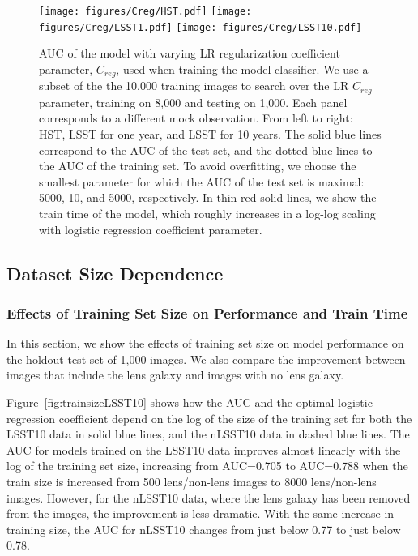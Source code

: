 \documentclass{emulateapj}
\begin{document}
\begin{figure*}[t]
\begin{center}
\texttt{[image: figures/Creg/HST.pdf]}
\texttt{[image: figures/Creg/LSST1.pdf]}
\texttt{[image: figures/Creg/LSST10.pdf]}
\caption{AUC of the model with varying LR regularization coefficient
  parameter, $C_{reg}$, used when training the model classifier.  We
  use a subset of the the 10,000 training images to search over the LR
  $C_{reg}$ parameter, training on 8,000 and testing on 1,000.  Each
  panel corresponds to a different mock observation.  From left to
  right: HST, LSST for one year, and LSST for 10 years.  The solid
  blue lines correspond to the AUC of the test set, and the dotted
  blue lines to the AUC of the training set.  To avoid overfitting, we
  choose the smallest parameter for which the AUC of the test set is
  maximal: 5000, 10, and 5000, respectively.  In thin red solid lines,
  we show the train time of the model, which roughly increases in a
  log-log scaling with logistic regression coefficient
  parameter.}\label{fig:regularization}
\end{center}
\end{figure*}

\subsection{Dataset Size Dependence}\label{sec:datasize}
\subsubsection{Effects of Training Set Size on Performance and Train Time}\label{sec:trainsetsize}

In this section, we show the effects of training set size on model
performance on the holdout test set of 1,000 images.  We also compare
the improvement between images that include the lens galaxy and images
with no lens galaxy.

Figure~\ref{fig:trainsizeLSST10} shows how the AUC and the optimal
logistic regression coefficient depend on the log of the size of the
training set for both the LSST10 data in solid blue lines, and the
nLSST10 data in dashed blue lines.  The AUC for models trained on the
LSST10 data improves almost linearly with the log of the training set
size, increasing from AUC=0.705 to AUC=0.788 when the train size is
increased from 500 lens/non-lens images to 8000 lens/non-lens images.
However, for the nLSST10 data, where the lens galaxy has been removed
from the images, the improvement is less dramatic.  With the same
increase in training size, the AUC for nLSST10 changes from just below
0.77 to just below 0.78.
\end{document}
